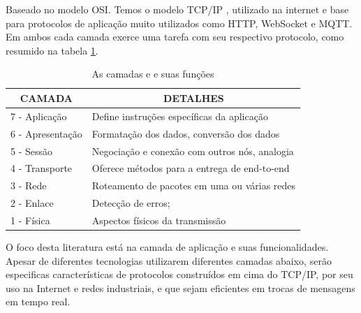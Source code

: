 Baseado no modelo OSI. Temos o modelo TCP/IP \cite{TCPIP}, utilizado na internet e base para protocolos de aplicação muito utilizados como HTTP, WebSocket e MQTT. Em ambos cada camada exerce uma tarefa com seu respectivo protocolo, como resumido na tabela \ref{table:1.2.0}.

\begin{table}[h]
\centering
\caption{As camadas e e suas funções}
\begin{tabular}{|l|l|}
\hline
\multicolumn{1}{|c|}{CAMADA} & \multicolumn{1}{c|}{DETALHES}                                                  \\ \hline
7 - Aplicação                & Define instruções específicas da aplicação          						    \\ \hline
6 - Apresentação             & Formatação dos dados, conversão dos dados                     					\\ \hline
5 - Sessão                   & Negociação e conexão com outros nós, analogia                                \\ \hline
4 - Transporte               & Oferece métodos para a entrega de end-to-end                        			\\ \hline
3 - Rede                     & Roteamento de pacotes em uma ou várias redes                                 \\ \hline
2 - Enlace                   & Detecção de erros;                                                            \\ \hline
1 - Física                   & Aspectos físicos da transmissão \\ \hline
\end{tabular}
\label{table:1.2.0}
\end{table}


O foco desta literatura está na camada de aplicação e suas funcionalidades. Apesar de diferentes tecnologias utilizarem diferentes camadas abaixo, serão especificas características de protocolos construídos em cima do TCP/IP, por seu uso na Internet e redes industriais, e que sejam eficientes em trocas de mensagens em tempo real.

